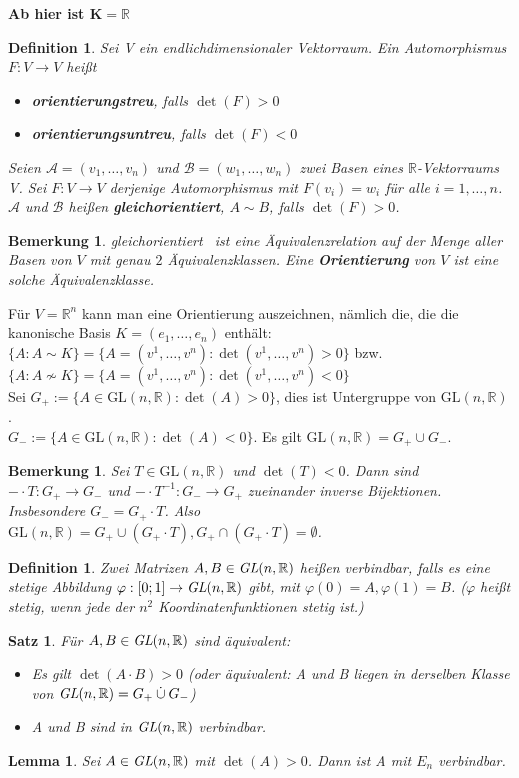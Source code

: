 \documentclass[12pt,a4paper]{article}
\theoremstyle{plain}
\newtheorem{Satz}[Theorem]{Satz}
\newtheorem{Lemma}[Theorem]{Lemma}
\newtheorem{Definition}[Theorem]{Definition}
\newtheorem{Bemerkung}[Theorem]{Bemerkung}
\newcommand{\herv}[1]{{\emph{\textbf{#1}}}}
\newcommand{\R}{\mathbb{R}}
\newcommand{\cupdot}{\mathbin{\dot{\cup}}}
\numberwithin{equation}{section}
\begin{document}
\textbf{Ab hier ist $\mathbf{K=\R}$}
\begin{Definition}
Sei V ein endlichdimensionaler Vektorraum. Ein Automorphismus $F:V\rightarrow V$ heißt \begin{itemize}
\item \herv{orientierungstreu}, falls $\det(F)>0$
\item \herv{orientierungsuntreu}, falls $\det(F)<0$
\end{itemize}
Seien $\mathcal{A}=(v_1,\ldots,v_n)$ und $\mathcal{B}=(w_1,\ldots,w_n)$ zwei Basen eines $\R$-Vektorraums V. Sei $F:V\rightarrow V$ derjenige Automorphismus mit $F(v_i)=w_i$ für alle $i=1,\ldots,n$. $\mathcal{A}$ und $\mathcal{B}$ heißen \herv{gleichorientiert}, $A\sim B$, falls $\det(F)>0$.
\end{Definition}
\begin{Bemerkung}
\glqq gleichorientiert \grqq\ ist eine Äquivalenzrelation auf der Menge aller Basen von $V$ mit genau $2$ Äquivalenzklassen. Eine \herv{Orientierung} von $V$ ist eine solche Äquivalenzklasse.
\end{Bemerkung}
Für $V=\R^n$ kann man eine Orientierung auszeichnen, nämlich die, die die kanonische Basis $K=(e_1,\ldots,e_n)$ enthält: $\{A:A\sim K\}=\{A=(v^1,\ldots,v^n):\det(v^1,\ldots,v^n)>0\}$ bzw. $\{A:A\not\sim K\}=\{A=(v^1,\ldots,v^n):\det(v^1,\ldots,v^n)<0\}$\\
Sei $G_+:=\{A\in \text{GL}(n,\R):\det(A)>0\}$, dies ist Untergruppe von $\text{GL}(n,\R)$.\\
$G_-:=\{A\in \text{GL}(n,\R):\det(A)<0\}$. Es gilt $\text{GL}(n,\R)=G_+\cup G_{-}$.
\begin{Bemerkung}
Sei $T\in \text{GL}(n,\R)$ und $\det(T)<0$. Dann sind $-\cdot T: G_{+}\rightarrow G_-$ und $-\cdot T^{-1} : G_-\rightarrow G_+$ zueinander inverse Bijektionen. Insbesondere $G_-=G_+\cdot T$. Also $\text{GL}(n,\R)=G_+\cup (G_+\cdot T), G_+\cap(G_+\cdot T)=\emptyset$.
\end{Bemerkung}
\begin{Definition}
Zwei Matrizen $A,B\in \emph{GL}(n,\R)$ heißen verbindbar, falls es eine stetige Abbildung $\varphi:[0;1]\rightarrow \emph{GL}(n,\R)$ gibt, mit $\varphi(0)=A, \varphi(1)=B$. ($\varphi$ heißt stetig, wenn jede der $n^2$ Koordinatenfunktionen stetig ist.)
\end{Definition}
\begin{Satz}
Für $A,B\in \emph{GL}(n,\R)$ sind äquivalent:
\begin{itemize}
\renewcommand{\labelenumi}{\emph{(\roman{enumi})}}
\item Es gilt $\det(A\cdot B)>0$ (oder äquivalent: A und B liegen in derselben Klasse von $\emph{GL}(n,\R)=G_+\cupdot G_-$)
\item A und B sind in $\emph{GL}(n,\R)$ verbindbar.
\end{itemize}
\end{Satz}
\begin{Lemma}
Sei $A\in \emph{GL}(n,\R)$ mit $\det(A)>0$. Dann ist A mit $E_n$ verbindbar.
\end{Lemma}
\end{document}
